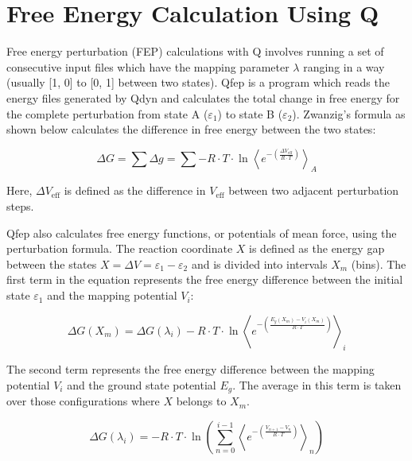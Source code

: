\documentclass{article}
\begin{document}
\section{Free Energy Calculation Using Q}

Free energy perturbation (FEP) calculations with Q involves running a set of consecutive input files which have the mapping parameter $\lambda$ ranging in a way (usually [1, 0] to [0, 1] between two states). Qfep is a program which reads the energy files generated by Qdyn and calculates the total change in free energy for the complete perturbation from state A ($\varepsilon_1$) to state B ($\varepsilon_2$). Zwanzig’s formula as shown below calculates the difference in free energy between the two states:

\begin{equation}
    \Delta G = \sum \Delta g = \sum -R \cdot T \cdot \ln \left\langle e^{-\left(\frac{\Delta V_{\text{eff}}}{R \cdot T}\right)} \right\rangle_{A}
\end{equation}

Here, \(\Delta V_{\text{eff}}\) is defined as the difference in \( V_{\text{eff}} \) between two adjacent perturbation steps. 

Qfep also calculates free energy functions, or potentials of mean force, using the perturbation formula. The reaction coordinate \(X\) is defined as the energy gap between the states \(X = \Delta V = \varepsilon_1 - \varepsilon_2\) and is divided into intervals \(X_m\) (bins). The first term in the equation represents the free energy difference between the initial state \(\varepsilon_1\) and the mapping potential \(V_i\):

\begin{equation}
    \Delta G(X_m) = \Delta G (\lambda_i) - R \cdot T \cdot \ln \left\langle e^{-\left(\frac{E_g(X_m) - V_i(X_m)}{R \cdot T}\right)} \right\rangle_{i}
\end{equation}

The second term represents the free energy difference between the mapping potential \(V_i\) and the ground state potential \(E_g\). The average in this term is taken over those configurations where \(X\) belongs to \(X_m\).

\begin{equation}
    \Delta G(\lambda_i) = - R \cdot T \cdot \ln \left( \sum_{n=0}^{i-1} \left\langle e^{-\left(\frac{V_{n+1} - V_n}{R \cdot T}\right)} \right\rangle_{n} \right)
\end{equation}
\end{document}
